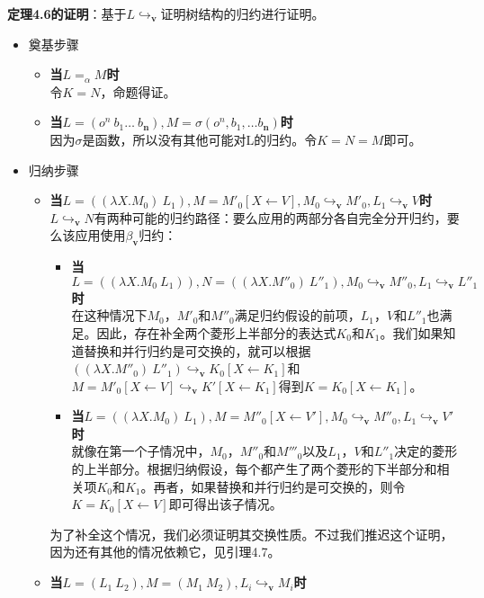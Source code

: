 \documentclass{book}
\begin{document}
\begin{adjustwidth}{20pt}{20pt}
 \textbf{定理4.6的证明}：基于$L\hookrightarrow_{\mathbf{v}}$证明树结构的归约进行证明。
 \begin{itemize}
  \item 奠基步骤
  \begin{itemize}
   \item \textbf{当$L=_\alpha M$时}\\
   令$K=N$，命题得证。
   \item \textbf{当$L=(o^n\ b_1\ldots\ b_\textbf{n}),M=\sigma(o^n,b_1,\ldots b_\textbf{n})$时}\\
   因为$\sigma$是函数，所以没有其他可能对L的归约。令$K=N=M$即可。
  \end{itemize}
  \item 归纳步骤
  \begin{itemize}
   \item \textbf{当$L=((\lambda X.M_0)\ L_1), M=M'_0[X\leftarrow V],M_0\hookrightarrow_{\mathbf{v}}M'_0,L_1\hookrightarrow_{\mathbf{v}}V$时}\\
   $L\hookrightarrow_{\mathbf{v}}N$有两种可能的归约路径：要么应用的两部分各自完全分开归约，要么该应用使用$\beta_{\mathbf{v}}$归约：
    \begin{itemize}
     \item \textbf{当}$L=((\lambda X.M_0\ L_1)), N=((\lambda X.M''_0)\ L''_1), M_0\hookrightarrow_{\mathbf{v}}M''_0, L_1\hookrightarrow_{\mathbf{v}}L''_1$\textbf{时}\\
     在这种情况下$M_0$，$M'_0$和$M''_0$满足归约假设的前项，$L_1$，$V$和$L''_1$也满足。因此，存在补全两个菱形上半部分的表达式$K_0$和$K_1$。我们如果知道替换和并行归约是可交换的，就可以根据$((\lambda X.M''_0)\ L''_1)\hookrightarrow_{\mathbf{v}}K_0[X\leftarrow K_1]$和$M=M'_0[X\leftarrow V]\hookrightarrow_{\mathbf{v}}K'[X\leftarrow K_1]$得到$K=K_0[X\leftarrow K_1]$。
      \item \textbf{当$L=((\lambda X.M_0)\ L_1), M=M''_0[X\leftarrow V'],M_0\hookrightarrow_{\mathbf{v}}M''_0,L_1\hookrightarrow_{\mathbf{v}}V'$时}\\
      就像在第一个子情况中，$M_0$，$M''_0$和$M'''_0$以及$L_1$，$V$和$L''_1$决定的菱形的上半部分。根据归纳假设，每个都产生了两个菱形的下半部分和相关项$K_0$和$K_1$。再者，如果替换和并行归约是可交换的，则令$K=K_0[X\leftarrow V]$即可得出该子情况。
    \end{itemize}
  为了补全这个情况，我们必须证明其交换性质。不过我们推迟这个证明，因为还有其他的情况依赖它，见引理4.7。
  \item \textbf{当}$L=(L_1\ L_2), M= (M_1\ M_2), L_i\hookrightarrow_{\mathbf{v}}M_i$\textbf{时}

\end{itemize}
\end{itemize}
\end{adjustwidth}
\end{document}
